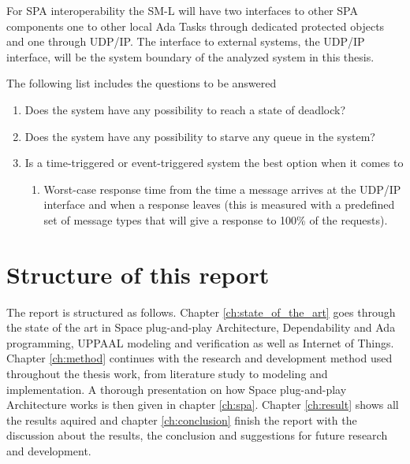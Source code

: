 For SPA interoperability the SM-L will have two interfaces to other SPA
components one to other local Ada Tasks through dedicated protected objects and
one through UDP/IP. The interface to external systems, the UDP/IP interface,
will be the system boundary of the analyzed system in this thesis.


The following list includes the questions to be answered
\begin{enumerate}
    \item Does the system have any possibility to reach a state of deadlock?
    \item Does the system have any possibility to starve any queue in the
        system?
    \item Is a time-triggered or event-triggered system the best option when it comes to
        \begin{enumerate}
            \item Worst-case response time from the time a message arrives at
                the UDP/IP interface and when a response leaves (this is
                measured with a predefined set of message types that will give
                a response to 100\% of the requests).
        \end{enumerate}
\end{enumerate}

\section{Structure of this report}
The report is structured as follows. Chapter \ref{ch:state_of_the_art} goes
through the state of the art in Space plug-and-play Architecture, Dependability
and Ada programming, UPPAAL modeling and verification as well as Internet of
Things.  Chapter \ref{ch:method} continues with the research and development
method used throughout the thesis work, from literature study to modeling and
implementation. A thorough presentation on how Space plug-and-play Architecture 
works is then given in chapter \ref{ch:spa}. Chapter \ref{ch:result} shows all
the results aquired and chapter \ref{ch:conclusion} finish the report with the
discussion about the results, the conclusion and suggestions for future
research and development.

